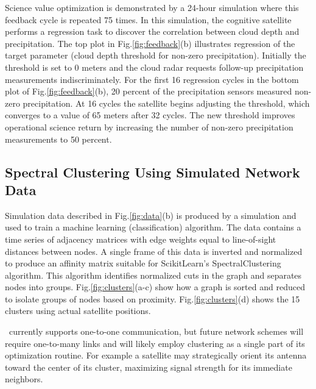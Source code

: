 \documentclass[conference]{IEEEtran}
\newcommand{\project}{{\sc{Collaborate}}~}
\begin{document}
Science value optimization is demonstrated by a 24-hour simulation where this feedback cycle is repeated 75 times.  In this simulation, the cognitive satellite performs a regression task to discover the correlation between cloud depth and precipitation.  The top plot in Fig.\ref{fig:feedback}(b) illustrates regression of the target parameter (cloud depth threshold for non-zero precipitation).  Initially the threshold is set to 0 meters and the cloud radar requests follow-up precipitation measurements indiscriminately.  For the first 16 regression cycles in the bottom plot of Fig.\ref{fig:feedback}(b), 20 percent of the precipitation sensors measured non-zero precipitation.  At 16 cycles the satellite begins adjusting the threshold, which converges to a value of 65 meters after 32 cycles.  The new threshold improves operational science return by increasing the number of non-zero precipitation measurements to 50 percent.

\subsection{Spectral Clustering Using Simulated Network Data}
\label{ssec:cluster}

Simulation data described in Fig.\ref{fig:data}(b) is produced by a simulation and used to train a machine learning (classification) algorithm.  The data contains a time series of adjacency matrices with edge weights equal to line-of-sight distances between nodes.  A single frame of this data is inverted and normalized to produce an affinity matrix suitable for ScikitLearn's SpectralClustering algorithm.  This algorithm identifies normalized cuts in the graph and separates nodes into groups.  Fig.\ref{fig:clusters}(a-c) show how a graph is sorted and reduced to isolate groups of nodes based on proximity.  Fig.\ref{fig:clusters}(d) shows the 15 clusters using actual satellite positions.

\project currently supports one-to-one communication, but future network schemes will require one-to-many links and will likely employ clustering as a single part of its optimization routine.  For example a satellite may strategically orient its antenna toward the center of its cluster, maximizing signal strength for its immediate neighbors.

\end{document}
